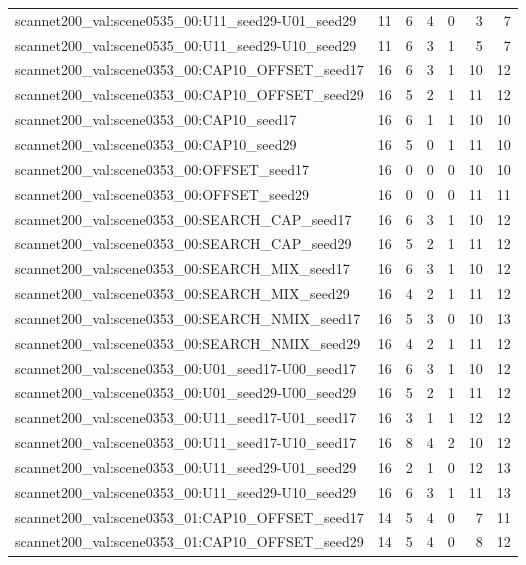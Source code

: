 \begin{table}[t]
\begin{tabular}{lrrrrrr}
scannet200\_val:scene0535\_00:U11\_seed29-U01\_seed29 & 11 & 6 & 4 & 0 & 3 & 7 \\
scannet200\_val:scene0535\_00:U11\_seed29-U10\_seed29 & 11 & 6 & 3 & 1 & 5 & 7 \\
scannet200\_val:scene0353\_00:CAP10\_OFFSET\_seed17 & 16 & 6 & 3 & 1 & 10 & 12 \\
scannet200\_val:scene0353\_00:CAP10\_OFFSET\_seed29 & 16 & 5 & 2 & 1 & 11 & 12 \\
scannet200\_val:scene0353\_00:CAP10\_seed17 & 16 & 6 & 1 & 1 & 10 & 10 \\
scannet200\_val:scene0353\_00:CAP10\_seed29 & 16 & 5 & 0 & 1 & 11 & 10 \\
scannet200\_val:scene0353\_00:OFFSET\_seed17 & 16 & 0 & 0 & 0 & 10 & 10 \\
scannet200\_val:scene0353\_00:OFFSET\_seed29 & 16 & 0 & 0 & 0 & 11 & 11 \\
scannet200\_val:scene0353\_00:SEARCH\_CAP\_seed17 & 16 & 6 & 3 & 1 & 10 & 12 \\
scannet200\_val:scene0353\_00:SEARCH\_CAP\_seed29 & 16 & 5 & 2 & 1 & 11 & 12 \\
scannet200\_val:scene0353\_00:SEARCH\_MIX\_seed17 & 16 & 6 & 3 & 1 & 10 & 12 \\
scannet200\_val:scene0353\_00:SEARCH\_MIX\_seed29 & 16 & 4 & 2 & 1 & 11 & 12 \\
scannet200\_val:scene0353\_00:SEARCH\_NMIX\_seed17 & 16 & 5 & 3 & 0 & 10 & 13 \\
scannet200\_val:scene0353\_00:SEARCH\_NMIX\_seed29 & 16 & 4 & 2 & 1 & 11 & 12 \\
scannet200\_val:scene0353\_00:U01\_seed17-U00\_seed17 & 16 & 6 & 3 & 1 & 10 & 12 \\
scannet200\_val:scene0353\_00:U01\_seed29-U00\_seed29 & 16 & 5 & 2 & 1 & 11 & 12 \\
scannet200\_val:scene0353\_00:U11\_seed17-U01\_seed17 & 16 & 3 & 1 & 1 & 12 & 12 \\
scannet200\_val:scene0353\_00:U11\_seed17-U10\_seed17 & 16 & 8 & 4 & 2 & 10 & 12 \\
scannet200\_val:scene0353\_00:U11\_seed29-U01\_seed29 & 16 & 2 & 1 & 0 & 12 & 13 \\
scannet200\_val:scene0353\_00:U11\_seed29-U10\_seed29 & 16 & 6 & 3 & 1 & 11 & 13 \\
scannet200\_val:scene0353\_01:CAP10\_OFFSET\_seed17 & 14 & 5 & 4 & 0 & 7 & 11 \\
scannet200\_val:scene0353\_01:CAP10\_OFFSET\_seed29 & 14 & 5 & 4 & 0 & 8 & 12 \\

\end{tabular}
\end{table}
